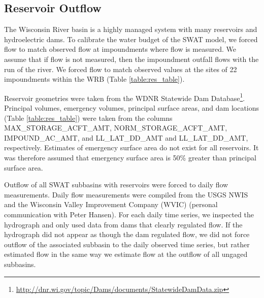 \subsection{Reservoir Outflow}\label{sec:reservoirs}

The Wisconsin River basin is a highly managed system with many reservoirs and hydroelectric dams. To calibrate the water budget of the SWAT model, we forced flow to match observed flow at impoundments where flow is measured. We assume that if flow is not measured, then the impoundment outfall flows with the run of the river. We forced flow to match observed values at the sites of 22 impoundments within the WRB (Table \ref{table:res_table}).

Reservoir geometries were taken from the WDNR Statewide Dam Database\footnote{\url{http://dnr.wi.gov/topic/Dams/documents/StatewideDamData.zip}}. Principal volumes, emergency volumes, principal surface areas, and dam locations (Table \ref{table:res_table}) were taken from the columns MAX\_STORAGE\_ACFT\_AMT, NORM\_STORAGE\_ACFT\_AMT, IMPOUND\_AC\_AMT, and LL\_LAT\_DD\_AMT and LL\_LAT\_DD\_AMT, respectively. Estimates of emergency surface area do not exist for all reservoirs. It was therefore assumed that emergency surface area is 50\% greater than principal surface area.

Outflow of all SWAT subbasins with reservoirs were forced to daily flow measurements. Daily flow measurements were compiled from the USGS NWIS  and the Wisconsin Valley Improvement Company (WVIC) (personal communication with Peter Hansen). For each daily time series, we inspected the hydrograph and only used data from dams that clearly regulated flow. If the hydrograph did not appear as though the dam regulated flow, we did not force outflow of the associated subbasin to the daily observed time series, but rather estimated flow in the same way we estimate flow at the outflow of all ungaged subbasins. 
